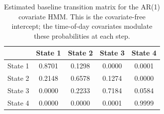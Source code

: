\begin{table}[ht]
\centering
\begin{tabular}{lcccc}
\hline
 & State 1 & State 2 & State 3 & State 4 \\
\hline
State 1 & 0.8701 & 0.1298 & 0.0000 & 0.0001 \\
State 2 & 0.2148 & 0.6578 & 0.1274 & 0.0000 \\
State 3 & 0.0000 & 0.2233 & 0.7184 & 0.0584 \\
State 4 & 0.0000 & 0.0000 & 0.0001 & 0.9999 \\
\hline
\end{tabular}
\caption{Estimated baseline transition matrix for the AR(1) covariate HMM. This is the covariate-free intercept; the time-of-day covariates modulate these probabilities at each step.}
\label{tab:ar_1_covariate_hmm_transition}
\end{table}
